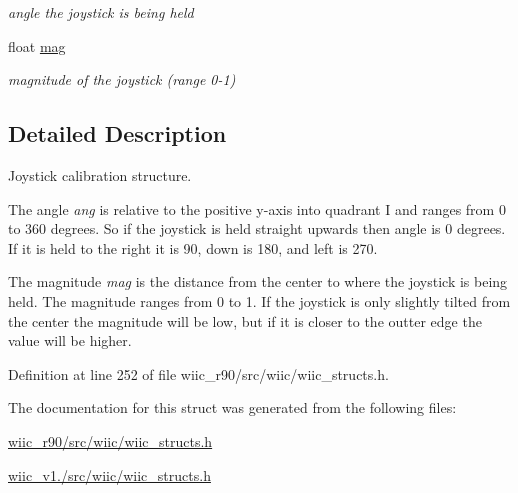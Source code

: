 \begin{DoxyCompactItemize}
\begin{DoxyCompactList}\small\item\em angle the joystick is being held \end{DoxyCompactList}\item 
\hypertarget{structjoystick__t_af358a1cfed3d18c4ce62fb62632b56cf}{float \hyperlink{structjoystick__t_af358a1cfed3d18c4ce62fb62632b56cf}{mag}}\label{structjoystick__t_af358a1cfed3d18c4ce62fb62632b56cf}

\begin{DoxyCompactList}\small\item\em magnitude of the joystick (range 0-\/1) \end{DoxyCompactList}\end{DoxyCompactItemize}


\subsection{Detailed Description}
Joystick calibration structure. 

The angle {\itshape ang} is relative to the positive y-\/axis into quadrant I and ranges from 0 to 360 degrees. So if the joystick is held straight upwards then angle is 0 degrees. If it is held to the right it is 90, down is 180, and left is 270.

The magnitude {\itshape mag} is the distance from the center to where the joystick is being held. The magnitude ranges from 0 to 1. If the joystick is only slightly tilted from the center the magnitude will be low, but if it is closer to the outter edge the value will be higher. 

Definition at line 252 of file wiic\-\_\-r90/src/wiic/wiic\-\_\-structs.\-h.



The documentation for this struct was generated from the following files\-:\begin{DoxyCompactItemize}
\item 
\hyperlink{wiic__r90_2src_2wiic_2wiic__structs_8h}{wiic\-\_\-r90/src/wiic/wiic\-\_\-structs.\-h}\item 
\hyperlink{wiic__v1_81_2src_2wiic_2wiic__structs_8h}{wiic\-\_\-v1./src/wiic/wiic\-\_\-structs.\-h}\end{DoxyCompactItemize}
